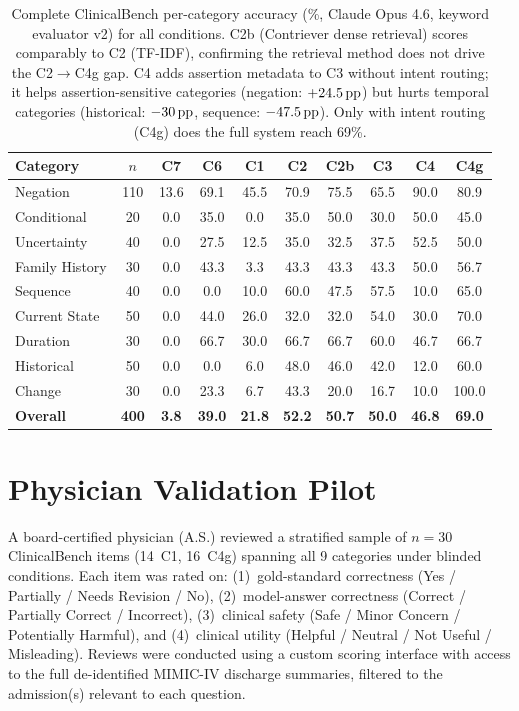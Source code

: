 \begin{table}[ht]
\centering
\small
\begin{tabular}{lccccccccc}
\toprule
\textbf{Category} & $n$ & \textbf{C7} & \textbf{C6} & \textbf{C1} & \textbf{C2} & \textbf{C2b} & \textbf{C3} & \textbf{C4} & \textbf{C4g} \\
\midrule
Negation & 110 & 13.6 & 69.1 & 45.5 & 70.9 & 75.5 & 65.5 & 90.0 & 80.9 \\
Conditional & 20 & 0.0 & 35.0 & 0.0 & 35.0 & 50.0 & 30.0 & 50.0 & 45.0 \\
Uncertainty & 40 & 0.0 & 27.5 & 12.5 & 35.0 & 32.5 & 37.5 & 52.5 & 50.0 \\
Family History & 30 & 0.0 & 43.3 & 3.3 & 43.3 & 43.3 & 43.3 & 50.0 & 56.7 \\
Sequence & 40 & 0.0 & 0.0 & 10.0 & 60.0 & 47.5 & 57.5 & 10.0 & 65.0 \\
Current State & 50 & 0.0 & 44.0 & 26.0 & 32.0 & 32.0 & 54.0 & 30.0 & 70.0 \\
Duration & 30 & 0.0 & 66.7 & 30.0 & 66.7 & 66.7 & 60.0 & 46.7 & 66.7 \\
Historical & 50 & 0.0 & 0.0 & 6.0 & 48.0 & 46.0 & 42.0 & 12.0 & 60.0 \\
Change & 30 & 0.0 & 23.3 & 6.7 & 43.3 & 20.0 & 16.7 & 10.0 & 100.0 \\
\midrule
\textbf{Overall} & \textbf{400} & \textbf{3.8} & \textbf{39.0} & \textbf{21.8} & \textbf{52.2} & \textbf{50.7} & \textbf{50.0} & \textbf{46.8} & \textbf{69.0} \\
\bottomrule
\end{tabular}
\caption{Complete ClinicalBench per-category accuracy (\%, Claude Opus 4.6, keyword evaluator v2) for all conditions. C2b (Contriever dense retrieval) scores comparably to C2 (TF-IDF), confirming the retrieval method does not drive the C2$\to$C4g gap. C4 adds assertion metadata to C3 without intent routing; it helps assertion-sensitive categories (negation: $+24.5\,\text{pp}$) but hurts temporal categories (historical: $-30\,\text{pp}$, sequence: $-47.5\,\text{pp}$). Only with intent routing (C4g) does the full system reach 69\%.}
\label{tab:full_percategory}
\end{table}


\section{Physician Validation Pilot}
\label{app:human}

A board-certified physician (A.S.) reviewed a stratified sample of $n=30$ ClinicalBench items (14~C1, 16~C4g) spanning all 9 categories under blinded conditions.
Each item was rated on: (1)~gold-standard correctness (Yes / Partially / Needs Revision / No), (2)~model-answer correctness (Correct / Partially Correct / Incorrect), (3)~clinical safety (Safe / Minor Concern / Potentially Harmful), and (4)~clinical utility (Helpful / Neutral / Not Useful / Misleading).
Reviews were conducted using a custom scoring interface with access to the full de-identified MIMIC-IV discharge summaries, filtered to the admission(s) relevant to each question.

